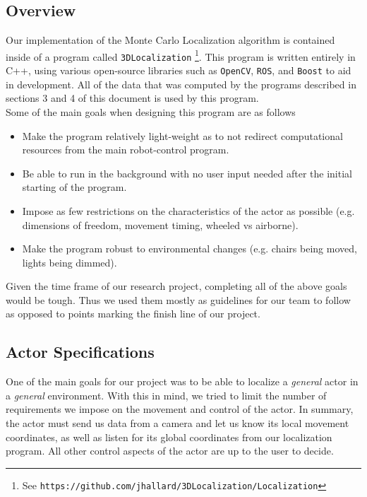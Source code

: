 \documentclass[a4paper,11pt]{article}
\begin{document}
 \subsection{Overview}
 Our implementation of the Monte Carlo Localization algorithm is contained inside of a program called \texttt{3DLocalization} \footnote{See \texttt{https://github.com/jhallard/3DLocalization/Localization}}. This program is written entirely in C++, using various open-source libraries such as \texttt{OpenCV}, \texttt{ROS}, and \texttt{Boost} to aid in development. All of the data that was computed by the programs described in sections 3 and 4 of this document is used by this program. \\
 Some of the main goals when designing this program are as follows 
 \begin{itemize}
 \item Make the program relatively light-weight as to not redirect computational resources from the main robot-control program.
 \item Be able to run in the background with no user input needed after the initial starting of the program. 
 \item Impose as few restrictions on the characteristics of the actor as possible (e.g. dimensions of freedom, movement timing, wheeled vs airborne).
 \item Make the program robust to environmental changes (e.g. chairs being moved, lights being dimmed).
 \end{itemize}
  Given the time frame of our research project, completing all of the above goals would be tough. Thus we used them mostly as guidelines for our team to follow as opposed to points marking the finish line of our project.
 


\subsection{Actor Specifications}
One of the main goals for our project was to be able to localize a \emph{general} actor in a \emph{general} environment. With this in mind, we tried to limit the number of requirements we impose on the movement and control of the actor. In summary, the actor must send us data from a camera and let us know its local movement coordinates, as well as listen for its global coordinates from our localization program. All other control aspects of the actor are up to the user to decide. 
\end{document}
